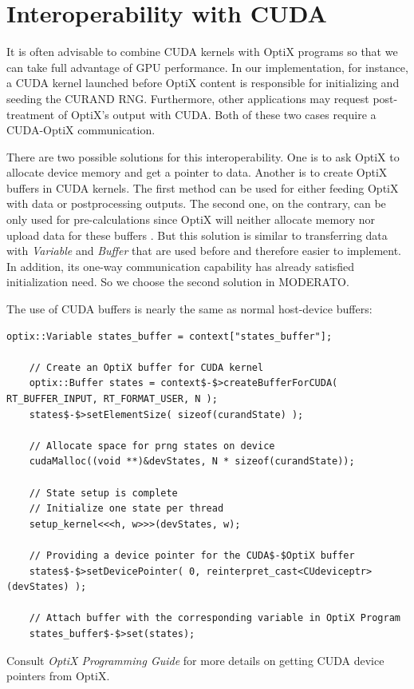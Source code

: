 
\section{Interoperability with CUDA}
\label{interop}
It is often advisable to combine CUDA kernels with OptiX programs so that we can take full advantage of GPU performance. In our implementation, for instance, a CUDA kernel launched before OptiX content is responsible for initializing and seeding the CURAND RNG. Furthermore, other applications may request post-treatment of OptiX's output with CUDA. Both of these two cases require a CUDA-OptiX communication.

There are two possible solutions for this interoperability. One is to ask OptiX to allocate device memory and get a pointer to data. Another is to create OptiX buffers in CUDA kernels. The first method can be used for either feeding OptiX with data or postprocessing outputs. The second one, on the contrary, can be only used for pre-calculations since OptiX will neither allocate memory nor upload data for these buffers \citep{Reference6}. But this solution is similar to transferring data with \textit{Variable} and \textit{Buffer} that are used before and therefore easier to implement. In addition, its one-way communication capability has already satisfied initialization need. So we choose the second solution in MODERATO.

The use of CUDA buffers is nearly the same as normal host-device buffers:
\begin{lstlisting}[mathescape]
    optix::Variable states_buffer = context["states_buffer"];
      
    // Create an OptiX buffer for CUDA kernel         
    optix::Buffer states = context$-$>createBufferForCUDA( RT_BUFFER_INPUT, RT_FORMAT_USER, N );
    states$-$>setElementSize( sizeof(curandState) );
      
    // Allocate space for prng states on device 
    cudaMalloc((void **)&devStates, N * sizeof(curandState));
     
    // State setup is complete
    // Initialize one state per thread
    setup_kernel<<<h, w>>>(devStates, w);

    // Providing a device pointer for the CUDA$-$OptiX buffer
    states$-$>setDevicePointer( 0, reinterpret_cast<CUdeviceptr>(devStates) );
      
    // Attach buffer with the corresponding variable in OptiX Program
    states_buffer$-$>set(states);
\end{lstlisting}
Consult \textit{OptiX Programming Guide} for more details on getting CUDA device pointers from OptiX.

